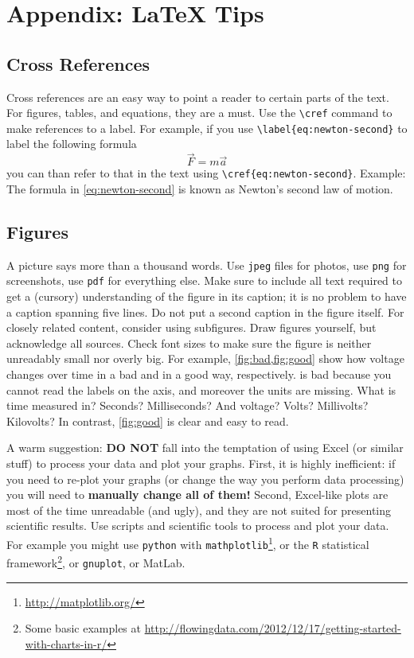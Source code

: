 \section{Appendix: \LaTeX\xspace Tips}

\subsection{Cross References}
\label{sec:cross-ref}

Cross references are an easy way to point a reader to certain parts of the text.
For figures, tables, and equations, they are a must.
Use the \verb|\cref| command to make references to a label.
For example, if you use \verb|\label{eq:newton-second}| to label the following formula
\begin{equation}
	\vec{F} = m\vec{a}\label{eq:newton-second}
\end{equation}
you can than refer to that in the text using \verb|\cref{eq:newton-second}|.
Example: The formula in \cref{eq:newton-second} is known as Newton's second law of motion.

\subsection{Figures}

A picture says more than a thousand words.
Use \texttt{jpeg} files for photos, use \texttt{png} for screenshots, use \texttt{pdf} for everything else.
Make sure to include all text required to get a (cursory) understanding of the figure in its caption; it is no problem to have a caption spanning five lines.
Do not put a second caption in the figure itself.
For closely related content, consider using subfigures.
Draw figures yourself, but acknowledge all sources.
Check font sizes to make sure the figure is neither unreadably small nor overly big.
For example, \cref{fig:bad,fig:good} show how voltage changes over time in a bad and in a good way, respectively.
 is bad because you cannot read the labels on the axis, and moreover the units are missing.
What is time measured in? Seconds? Milliseconds? And voltage? Volts? Millivolts? Kilovolts?
In contrast, \cref{fig:good} is clear and easy to read.

A warm suggestion: \textbf{DO NOT} fall into the temptation of using Excel (or similar stuff) to process your data and plot your graphs.
First, it is highly inefficient: if you need to re-plot your graphs (or change the way you perform data processing) you will need to \textbf{manually change all of them!}
Second, Excel-like plots are most of the time unreadable (and ugly), and they are not suited for presenting scientific results.
Use scripts and scientific tools to process and plot your data.
For example you might use \texttt{python} with \texttt{mathplotlib}\footnote{\url{http://matplotlib.org/}}, or the \texttt{R} statistical framework\footnote{Some basic examples at \url{http://flowingdata.com/2012/12/17/getting-started-with-charts-in-r/}}, or \texttt{gnuplot}, or MatLab.


